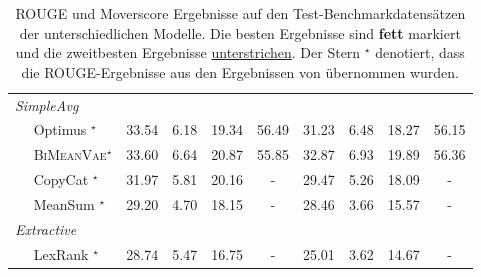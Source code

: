 \begin{table}[!h]
\begin{tabular}{@{}lcccc|cccc@{}}
    
    

    \textit{SimpleAvg}                   &       &      &       &       &       &      &       & \\
    $\quad$ Optimus  $^{\star}$          & 33.54 & 6.18 & 19.34 & 56.49 & 31.23 & 6.48 & 18.27 & 56.15\\
    $\quad$ \textsc{BiMeanVae}$^{\star}$ & 33.60 & 6.64 & 20.87 & 55.85 & 32.87 & 6.93 & 19.89 & 56.36\\
    $\quad$ CopyCat  $^{\star}$          & 31.97 & 5.81 & 20.16 & -     & 29.47 & 5.26 & 18.09 & -\\ 
    $\quad$ MeanSum  $^{\star}$          & 29.20 & 4.70 & 18.15 & -     & 28.46 & 3.66 & 15.57 & -\\ \midrule
    \textit{Extractive}                  &       &      &       &       &       &      &       &      \\
    $\quad$ LexRank  $^{\star}$          & 28.74 & 5.47 & 16.75 & -     & 25.01 & 3.62 & 14.67 & -\\ \bottomrule
    \end{tabular}
    \caption{ROUGE und Moverscore Ergebnisse auf den Test-Benchmarkdatensätzen der unterschiedlichen Modelle. Die besten Ergebnisse sind \textbf{fett} markiert und die zweitbesten Ergebnisse \underline{unterstrichen}.
    Der Stern $^{\star}$ denotiert, dass die ROUGE-Ergebnisse aus den Ergebnissen von \citep{coop} übernommen wurden.
    }
    \label{eval_results}
\end{table}


